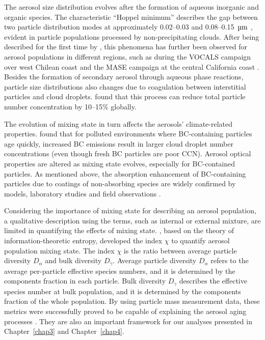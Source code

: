 \documentclass[edeposit,fullpage]{uiucthesis2009}
\begin{document}
The aerosol size distribution evolves after the formation of aqueous
inorganic and organic species. The characteristic ``Hoppel minimum''
describes the gap between two particle distribution modes at
approximately 0.02--0.03 and 0.08--0.15~$\rm \mu m$
\citep{Hoppel1986}, evident in particle populations processed by
non-precipitating clouds. After being described for the first time by
\citet{Hoppel1986}, this phenomena has further been observed for
aerosol populations in different regions, such as during the VOCALS
campaign over west Chilean coast \citep{kleinman2012aerosol} and the
MASE campaign at the central California coast
\citep{hudson2015cloud}. Besides the formation of secondary aerosol
through aqueous phase reactions, particle size distributions also
changes due to coagulation between interstitial particles and cloud
droplets. \citet{pierce2015importance} found that this process can
reduce total particle number concentration by 10--15\% globally.

The evolution of mixing state in turn affects the aerosols'
climate-related properties. \citet{Ching2016} found that for polluted
environments where BC-containing particles age quickly, increased BC
emissions result in larger cloud droplet number concentrations (even
though fresh BC particles are poor CCN). Aerosol optical properties
are altered as mixing state evolves, especially for BC-contained
particles. As mentioned above, the absorption enhancement of
BC-containing particles due to coatings of non-absorbing species are
widely confirmed by models, laboratory studies and field observations
\citep{Moffet2009,Liu2017,wu2020light,Fierce2020}.

Considering the importance of mixing state for describing an aerosol
population, a qualitative description using the terms, such as
internal or external mixture, are limited in quantifying the effects
of mixing state. \citet{Riemer2013a}, based on the theory of
information-theoretic entropy, developed the index $\chi$ to quantify
aerosol population mixing state. The index $\chi$ is the ratio between
average particle diversity $D_{\alpha}$ and bulk diversity
$D_{\gamma}$. Average particle diversity $D_{\alpha}$ refers to the average 
per-particle effective species numbers, and it is determined by the components
fraction in each particle. Bulk diversity $D_{\gamma}$ describes 
the effective species number at bulk population, and it is determined by the components
fraction of the whole population. By using particle mass measurement data, these metrics
were successfully proved to be capable of explaining the aerosol aging
processes \citep{Healy2014}. They are also an important framework for
our analyses presented in Chapter~\ref{chap3} and Chapter~\ref{chap4}.
\end{document}

